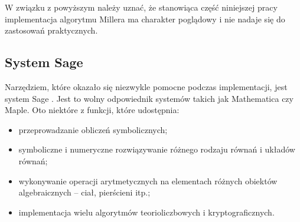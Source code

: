 \noindent
W związku z powyższym należy uznać, że stanowiąca część niniejszej pracy
implementacja algorytmu Millera ma charakter poglądowy
i nie nadaje się do zastosowań praktycznych.

\subsection*{System Sage}

\noindent
Narzędziem, które okazało się niezwykle pomocne podczas implementacji,
jest system Sage \cite{sage}.
Jest to wolny odpowiednik systemów takich jak Mathematica czy Maple.
Oto niektóre z funkcji, które udostępnia:
\begin{itemize}
\item
przeprowadzanie obliczeń symbolicznych;
\item
symboliczne i numeryczne rozwiązywanie
różnego rodzaju równań i układów równań;
\item
wykonywanie operacji arytmetycznych
na elementach różnych obiektów algebraicznych --
ciał, pierścieni itp.;
\item
implementacja wielu algorytmów teorioliczbowych i kryptograficznych.
\end{itemize}
